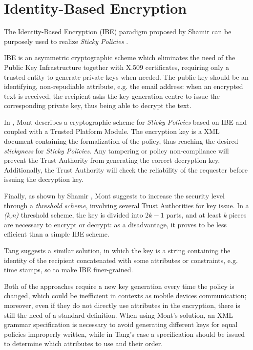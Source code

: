 \section{Identity-Based Encryption}
The Identity-Based Encryption (IBE) paradigm proposed by Shamir \cite{shamir1984identity} can be purposely used to realize \textit{Sticky Policies} \cite{mont2003towards}.

IBE is an asymmetric cryptographic scheme which eliminates the need of the Public Key Infrastructure together with X.509 certificates, requiring only a trusted entity to generate private keys when needed. The public key should be an identifying, non-repudiable attribute, e.g. the email address: when an encrypted text is received, the recipient asks the key-generation centre to issue the corresponding private key, thus being able to decrypt the text.

In \cite{mont2003towards}, Mont describes a cryptographic scheme for \textit{Sticky Policies} based on IBE and coupled with a Trusted Platform Module. The encryption key is a XML document containing the formalization of the policy, thus reaching the desired \textit{stickyness} for \textit{Sticky Policies}. Any tampering or policy non-compliance will prevent the Trust Authority from generating the correct decryption key. Additionally, the Trust Authority will check the reliability of the requester before issuing the decryption key. 

Finally, as shown by Shamir \cite{shamir1979share}, Mont suggests to increase the security level through a \textit{threshold scheme}, involving several Trust Authorities for key issue. In a \textit{(k,n)} threshold scheme, the key is divided into \(2k-1\) parts, and at least \textit{k} pieces are necessary to encrypt or decrypt: as a disadvantage, it proves to be less efficient than a simple IBE scheme.

Tang \cite{tang2008using} suggests a similar solution, in which the key is a string containing the identity of the recipient concatenated with some attributes or constraints, e.g. time stamps, so to make IBE finer-grained.

Both of the approaches require a new key generation every time the policy is changed, which could be inefficient in contexts as mobile devices communication; moreover, even if they do not directly use attributes in the encryption, there is still the need of a standard definition. When using Mont's solution, an XML grammar specification is necessary to avoid generating different keys for equal policies improperly written, while in Tang's case a specification should be issued to determine which attributes to use and their order.


